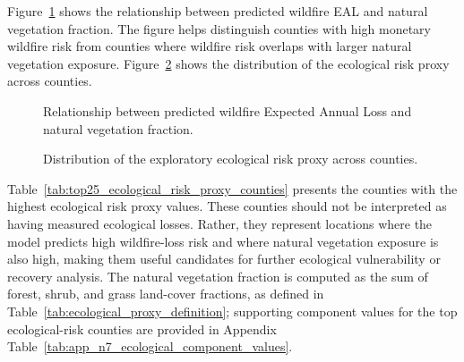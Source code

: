Figure~\ref{fig:predicted_eal_vs_natural_vegetation} shows the relationship between predicted wildfire EAL and natural vegetation fraction. The figure helps distinguish counties with high monetary wildfire risk from counties where wildfire risk overlaps with larger natural vegetation exposure. Figure~\ref{fig:ecological_risk_proxy_distribution} shows the distribution of the ecological risk proxy across counties.

\begin{figure}[htbp]
    \centering
    \caption{Relationship between predicted wildfire Expected Annual Loss and natural vegetation fraction.}
    \label{fig:predicted_eal_vs_natural_vegetation}
\end{figure}

\begin{figure}[htbp]
    \centering
    \caption{Distribution of the exploratory ecological risk proxy across counties.}
    \label{fig:ecological_risk_proxy_distribution}
\end{figure}

Table~\ref{tab:top25_ecological_risk_proxy_counties} presents the counties with the highest ecological risk proxy values. These counties should not be interpreted as having measured ecological losses. Rather, they represent locations where the model predicts high wildfire-loss risk and where natural vegetation exposure is also high, making them useful candidates for further ecological vulnerability or recovery analysis. The natural vegetation fraction is computed as the sum of forest, shrub, and grass land-cover fractions, as defined in Table~\ref{tab:ecological_proxy_definition}; supporting component values for the top ecological-risk counties are provided in Appendix Table~\ref{tab:app_n7_ecological_component_values}.



